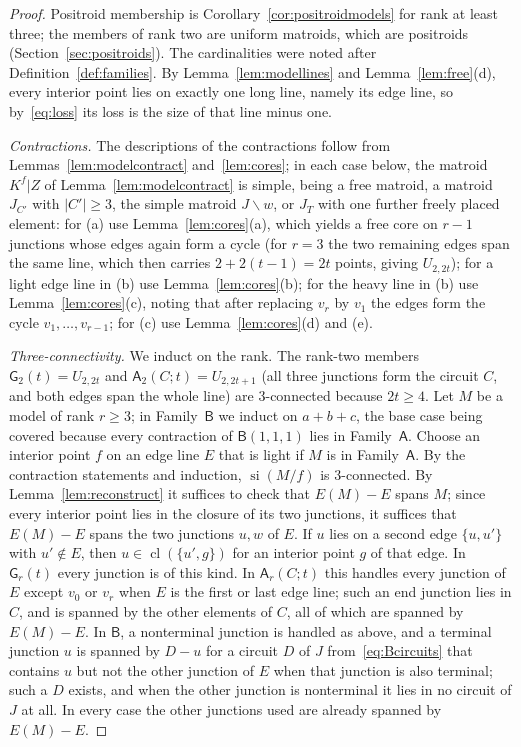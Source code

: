 \documentclass[11pt]{amsart}
\theoremstyle{definition}
\theoremstyle{remark}
\numberwithin{equation}{section}
\newcommand{\cl}{\operatorname{cl}}
\newcommand{\si}{\operatorname{si}}
\newcommand{\GW}{\mathsf{G}}
\newcommand{\FA}{\mathsf{A}}
\newcommand{\FB}{\mathsf{B}}
\begin{document}
\begin{proof}
Positroid membership is Corollary~\ref{cor:positroidmodels} for rank at least three; the members of rank two are uniform matroids, which are positroids (Section~\ref{sec:positroids}). The cardinalities were noted after Definition~\ref{def:families}. By Lemma~\ref{lem:modellines} and Lemma~\ref{lem:free}(d), every interior point lies on exactly one long line, namely its edge line, so by~\eqref{eq:loss} its loss is the size of that line minus one.

\emph{Contractions.} The descriptions of the contractions follow from Lemmas~\ref{lem:modelcontract} and~\ref{lem:cores}; in each case below, the matroid $K^f|Z$ of Lemma~\ref{lem:modelcontract} is simple, being a free matroid, a matroid $J_{C'}$ with $|C'|\ge3$, the simple matroid $J\backslash w$, or $J_T$ with one further freely placed element: for (a) use Lemma~\ref{lem:cores}(a), which yields a free core on $r-1$ junctions whose edges again form a cycle (for $r=3$ the two remaining edges span the same line, which then carries $2+2(t-1)=2t$ points, giving $U_{2,2t}$); for a light edge line in (b) use Lemma~\ref{lem:cores}(b); for the heavy line in (b) use Lemma~\ref{lem:cores}(c), noting that after replacing $v_r$ by $v_1$ the edges form the cycle $v_1,\dots,v_{r-1}$; for (c) use Lemma~\ref{lem:cores}(d) and (e).

\emph{Three-connectivity.} We induct on the rank. The rank-two members $\GW_2(t)=U_{2,2t}$ and $\FA_2(C;t)=U_{2,2t+1}$ (all three junctions form the circuit $C$, and both edges span the whole line) are $3$-connected because $2t\ge4$. Let $M$ be a model of rank $r\ge3$; in Family~$\FB$ we induct on $a+b+c$, the base case being covered because every contraction of $\FB(1,1,1)$ lies in Family~$\FA$. Choose an interior point $f$ on an edge line $E$ that is light if $M$ is in Family~$\FA$. By the contraction statements and induction, $\si(M/f)$ is $3$-connected. By Lemma~\ref{lem:reconstruct} it suffices to check that $E(M)-E$ spans $M$; since every interior point lies in the closure of its two junctions, it suffices that $E(M)-E$ spans the two junctions $u,w$ of $E$. If $u$ lies on a second edge $\{u,u'\}$ with $u'\notin E$, then $u\in\cl(\{u',g\})$ for an interior point $g$ of that edge. In $\GW_r(t)$ every junction is of this kind. In $\FA_r(C;t)$ this handles every junction of $E$ except $v_0$ or $v_r$ when $E$ is the first or last edge line; such an end junction lies in $C$, and is spanned by the other elements of $C$, all of which are spanned by $E(M)-E$. In $\FB$, a nonterminal junction is handled as above, and a terminal junction $u$ is spanned by $D-u$ for a circuit $D$ of $J$ from~\eqref{eq:Bcircuits} that contains $u$ but not the other junction of $E$ when that junction is also terminal; such a $D$ exists, and when the other junction is nonterminal it lies in no circuit of $J$ at all. In every case the other junctions used are already spanned by $E(M)-E$.


\end{proof}
\end{document}
